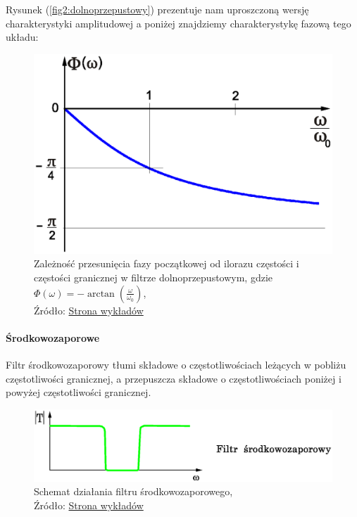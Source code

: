 \documentclass{article}
\begin{document}
            Rysunek (\ref{fig2:dolnoprzepustowy}) prezentuje nam uproszczoną wersję charakterystyki amplitudowej a poniżej znajdziemy charakterystykę fazową tego układu:
            \begin{figure}[!ht]
              \centering
              \includegraphics[scale=0.45]{grafiki/Rc_Phase.eps}
              \caption{Zależność przesunięcia fazy początkowej od ilorazu częstości i częstości granicznej w filtrze dolnoprzepustowym, gdzie $\varPhi(\omega) = -\arctan(\frac{\omega}{\omega_0})$,
              \\Źródło: \href{https://spe.if.uj.edu.pl/literatura}{Strona wykładów}}
            \end{figure}

          \paragraph{Środkowozaporowe}
            \mbox{}\newline
            Filtr środkowozaporowy tłumi składowe o częstotliwościach leżących w pobliżu częstotliwości granicznej, a przepuszcza składowe o częstotliwościach poniżej i powyżej częstotliwości granicznej.

            \begin{figure}[!ht]
              \centering
              \includegraphics[scale=0.35]{grafiki/srodkowozaporowy.eps}
              \caption{Schemat działania filtru środkowozaporowego,
              \\Źródło: \href{https://spe.if.uj.edu.pl/literatura}{Strona wykładów}}
            \end{figure}
\end{document}
